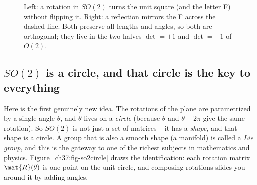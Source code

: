 \begin{figure}[H]
\centering
{}
\caption{Left: a rotation in $SO(2)$ turns the unit square (and the letter F)
without flipping it. Right: a reflection mirrors the F across the dashed line. Both
preserve all lengths and angles, so both are orthogonal; they live in the two
halves $\det=+1$ and $\det=-1$ of $O(2)$.}
\label{ch37:fig-on}
\end{figure}

\subsection{$SO(2)$ is a circle, and that circle is the key to everything}
\label{ch37:so2}

Here is the first genuinely new idea. The rotations of the plane are parametrized
by a single angle $\theta$, and $\theta$ lives on a \emph{circle} (because
$\theta$ and $\theta + 2\pi$ give the same rotation). So $SO(2)$ is not just a set
of matrices -- it has a \emph{shape}, and that shape is a circle. A group that is
also a smooth shape (a manifold) is called a \emph{Lie group}, and this is the
gateway to one of the richest subjects in mathematics and physics.
Figure~\ref{ch37:fig-so2circle} draws the identification: each rotation matrix
$\mat{R}(\theta)$ is one point on the unit circle, and composing rotations slides
you around it by adding angles.

